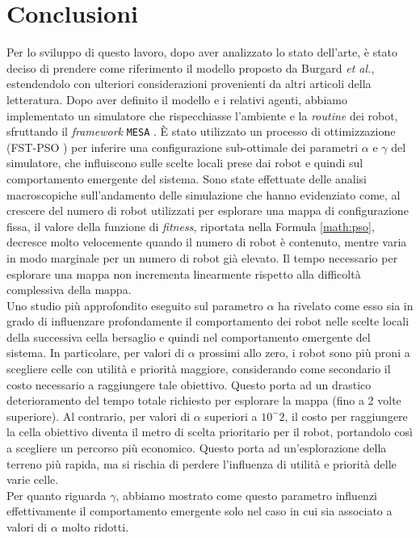 \chapter{Conclusioni}
Per lo sviluppo di questo lavoro, dopo aver analizzato lo stato dell'arte, è stato deciso di prendere come riferimento il modello proposto da Burgard \textit{et al.}, estendendolo con ulteriori considerazioni provenienti da altri articoli della letteratura.
Dopo aver definito il modello e i relativi agenti, abbiamo implementato un simulatore che rispecchiasse l'ambiente e la \textit{routine} dei robot, sfruttando il \textit{framework} \texttt{MESA} \cite{Mesa}.
È stato utilizzato un processo di ottimizzazione (FST-PSO \cite{nobile2018}) per inferire una configurazione sub-ottimale dei parametri $\alpha$ e $\gamma$ del simulatore, che influiscono sulle scelte locali prese dai robot e quindi sul comportamento emergente del sistema. 
Sono state effettuate delle analisi macroscopiche sull'andamento delle simulazione che hanno evidenziato come, al crescere del numero di robot utilizzati per esplorare una mappa di configurazione fissa, il valore della funzione di \textit{fitness}, riportata nella  Formula \ref{math:pso}, decresce molto velocemente quando il numero di robot è contenuto, mentre varia in modo marginale per un numero di robot già elevato.
Il tempo necessario per esplorare una mappa non incrementa linearmente rispetto alla difficoltà complessiva della mappa.\\
Uno studio più approfondito eseguito sul parametro $\alpha$ ha rivelato come esso sia in grado di influenzare profondamente il comportamento dei robot nelle scelte locali della successiva cella bersaglio e quindi nel comportamento emergente del sistema.
In particolare, per valori di $\alpha$ prossimi allo zero, i robot sono più proni a scegliere celle con utilità e priorità maggiore, considerando come secondario il costo necessario a raggiungere tale obiettivo. Questo porta ad un drastico deterioramento del tempo totale richiesto per esplorare la mappa (fino a 2 volte superiore).
Al contrario, per valori di $\alpha$ superiori a $10^-2$, il costo per raggiungere la cella obiettivo diventa il metro di scelta prioritario per il robot, portandolo così a scegliere un percorso più economico. Questo porta ad un'esplorazione della terreno più rapida, ma si rischia di perdere l'influenza di utilità e priorità delle varie celle.\\
Per quanto riguarda $\gamma$, abbiamo mostrato come questo parametro influenzi effettivamente il comportamento emergente solo nel caso in cui sia associato a valori di $\alpha$ molto ridotti.
